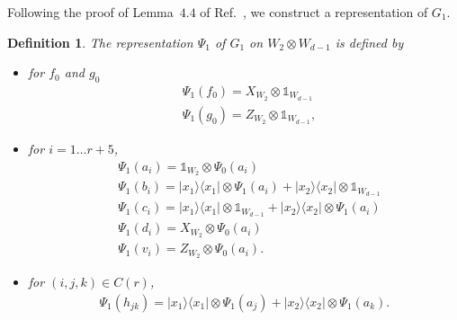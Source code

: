 \documentclass[11pt,letterpaper]{article}
\newcommand{\ketbra}[2]{|#1\rangle\langle#2|}
\newcommand{\x}{\otimes}
\newcommand{\1}{\mathbb{1}}
\newtheorem{definition}[theorem]{Definition}
\theoremstyle{definition}
\begin{document}
Following the proof of Lemma~$4.4$ of Ref.~\cite{slofstra2017}, we construct a representation of $G_1$.
\begin{definition}
The representation $\Psi_1$ of $G_1$ on $W_2 \x W_{d-1}$ is defined by
\begin{itemize}
\item for $f_0$ and $g_0$
\begin{align*}
	&\Psi_1(f_0) = X_{W_2} \x \1_{W_{d-1}} \\
	&\Psi_1(g_0) = Z_{W_2} \x \1_{W_{d-1}},
\end{align*}
\item
for $i = 1 \dots r+5$,
\begin{align*}
	&\Psi_1(a_i) = \1_{W_2} \x \Psi_0(a_i) \\
	&\Psi_1(b_i) = \ketbra{x_1}{x_1} \x \Psi_1(a_i) + \ketbra{x_2}{x_2} \x \1_{W_{d-1}} \\
	&\Psi_1(c_i) =\ketbra{x_1}{x_1} \x \1_{W_{d-1}} + \ketbra{x_2}{x_2} \x \Psi_1(a_i) \\
	&\Psi_1(d_i) =  X_{W_2} \x \Psi_0(a_i)\\
	&\Psi_1(v_i) = Z_{W_2} \x \Psi_0(a_i).
\end{align*}
\item for $(i,j,k) \in C(r)$,
\begin{align*}
	\Psi_1(h_{jk}) = \ketbra{x_1}{x_1} \x \Psi_1(a_j) + \ketbra{x_2}{x_2} \x \Psi_1(a_k).
\end{align*}
\end{itemize}
\end{definition}
\end{document}
